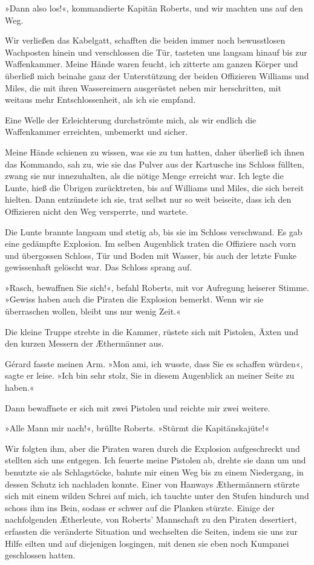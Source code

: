»Dann also los!«, kommandierte Kapitän Roberts, und wir machten uns
auf den Weg.

\bigpar

Wir verließen das Kabelgatt, schafften die beiden immer noch
bewusstlosen Wachposten hinein und verschlossen die Tür, tasteten
uns langsam hinauf bis zur Waffenkammer. Meine Hände waren feucht,
ich zitterte am ganzen Körper und überließ mich beinahe ganz der
Unterstützung der beiden Offizieren Williams und Miles, die mit
ihren Wassereimern ausgerüstet neben mir herschritten, mit weitaus
mehr Entschlossenheit, als ich sie empfand.

\bigpar

Eine Welle der Erleichterung durchströmte mich, als wir endlich die
Waffenkammer erreichten, unbemerkt und sicher.

Meine Hände schienen zu wissen, was sie zu tun hatten, daher
überließ ich ihnen das Kommando, sah zu, wie sie das Pulver aus der
Kartusche ins Schloss füllten, zwang sie nur innezuhalten, als die
nötige Menge erreicht war. Ich legte die Lunte, hieß die Übrigen
zurücktreten, bis auf Williams und Miles, die sich bereit hielten.
Dann entzündete ich sie, trat selbst nur so weit beiseite, dass ich
den Offizieren nicht den Weg versperrte, und wartete.

Die Lunte brannte langsam und stetig ab, bis sie im Schloss
verschwand. Es gab eine gedämpfte Explosion. Im selben Augenblick
traten die Offiziere nach vorn und übergossen Schloss, Tür und
Boden mit Wasser, bis auch der letzte Funke gewissenhaft gelöscht
war. Das Schloss sprang auf.

»Rasch, bewaffnen Sie sich!«, befahl Roberts, mit vor Aufregung
heiserer Stimme. »Gewiss haben auch die Piraten die Explosion
bemerkt. Wenn wir sie überraschen wollen, bleibt uns nur wenig
Zeit.«

Die kleine Truppe strebte in die Kammer, rüstete sich mit Pistolen,
Äxten und den kurzen Messern der Æthermänner aus.

Gérard fasste meinen Arm. »Mon ami, ich wusste, dass Sie es
schaffen würden«, sagte er leise. »Ich bin sehr stolz, Sie in
diesem Augenblick an meiner Seite zu haben.«

Dann bewaffnete er sich mit zwei Pistolen und reichte mir zwei
weitere.

»Alle Mann mir nach!«, brüllte Roberts. »Stürmt die
Kapitänskajüte!«

Wir folgten ihm, aber die Piraten waren durch die Explosion
aufgeschreckt und stellten sich uns entgegen. Ich feuerte meine
Pistolen ab, drehte sie dann um und benutzte sie als Schlagstöcke,
bahnte mir einen Weg bis zu einem Niedergang, in dessen Schutz ich
nachladen konnte. Einer von Hanways Æthermännern stürzte sich mit
einem wilden Schrei auf mich, ich tauchte unter den Stufen hindurch
und schoss ihm ins Bein, sodass er schwer auf die Planken stürzte.
Einige der nachfolgenden Ætherleute, von Roberts’ Mannschaft zu den
Piraten desertiert, erfassten die veränderte Situation und
wechselten die Seiten, indem sie uns zur Hilfe eilten und auf
diejenigen losgingen, mit denen sie eben noch Kumpanei geschlossen
hatten.

